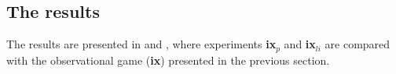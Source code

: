 \subsection{The results}

The results are presented in  and , where experiments {\bf ix$_p$} and {\bf ix$_{li}$} are compared with the observational game ({\bf ix}) presented in the previous section.

\begin{figure}
\centering
{}
\\
\\

\end{figure}
